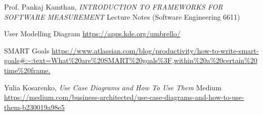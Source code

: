 \documentclass[letterpaper]{report}
\begin{document}
\clearpage
{}
{}

\begin{thebibliography}{. . .}

    Prof. Pankaj Kamthan,
    \textit{INTRODUCTION TO FRAMEWORKS FOR SOFTWARE MEASUREMENT }
    Lecture Notes (Software Engineering 6611)
    
    User Modelling Diagram
    \url{https://apps.kde.org/umbrello/}
    
    SMART Goals
    \url{https://www.atlassian.com/blog/productivity/how-to-write-smart-goals#:~:text=What%20are%20SMART%20goals%3F,within%20a%20certain%20time%20frame.}
    
    Yulia Kosarenko,
    \textit{Use Case Diagrams and How To Use Them}
    Medium
    \url{https://medium.com/business-architected/use-case-diagrams-and-how-to-use-them-b230019a98e5}
    
    \end{thebibliography}
\end{document}
